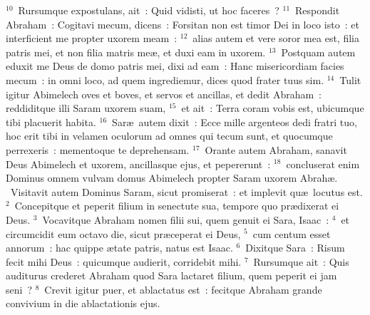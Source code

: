 ${}^{10}$~Rursumque expostulans, ait~: Quid vidisti, ut hoc faceres~?
${}^{11}$~Respondit Abraham~: Cogitavi mecum, dicens~: Forsitan non est timor Dei in loco isto~: et interficient me propter uxorem meam~:
${}^{12}$~alias autem et vere soror mea est, filia patris mei, et non filia matris me\ae , et duxi eam in uxorem.
${}^{13}$~Postquam autem eduxit me Deus de domo patris mei, dixi ad eam~: Hanc misericordiam facies mecum~: in omni loco, ad quem ingrediemur, dices quod frater tuus sim.
${}^{14}$~Tulit igitur Abimelech oves et boves, et servos et ancillas, et dedit Abraham~: reddiditque illi Saram uxorem suam,
${}^{15}$~et ait~: Terra coram vobis est, ubicumque tibi placuerit habita.
${}^{16}$~Sar\ae\ autem dixit~: Ecce mille argenteos dedi fratri tuo, hoc erit tibi in velamen oculorum ad omnes qui tecum sunt, et quocumque perrexeris~: mementoque te deprehensam.
${}^{17}$~Orante autem Abraham, sanavit Deus Abimelech et uxorem, ancillasque ejus, et pepererunt~:
${}^{18}$~concluserat enim Dominus omnem vulvam domus Abimelech propter Saram uxorem Abrah\ae .
~Visitavit autem Dominus Saram, sicut promiserat~: et implevit qu\ae\ locutus est.
${}^{2}$~Concepitque et peperit filium in senectute sua, tempore quo pr\ae dixerat ei Deus.
${}^{3}$~Vocavitque Abraham nomen filii sui, quem genuit ei Sara, Isaac~:
${}^{4}$~et circumcidit eum octavo die, sicut pr\ae ceperat ei Deus,
${}^{5}$~cum centum esset annorum~: hac quippe \ae tate patris, natus est Isaac.
${}^{6}$~Dixitque Sara~: Risum fecit mihi Deus~: quicumque audierit, corridebit mihi.
${}^{7}$~Rursumque ait~: Quis auditurus crederet Abraham quod Sara lactaret filium, quem peperit ei jam seni~?
${}^{8}$~Crevit igitur puer, et ablactatus est~: fecitque Abraham grande convivium in die ablactationis ejus.


